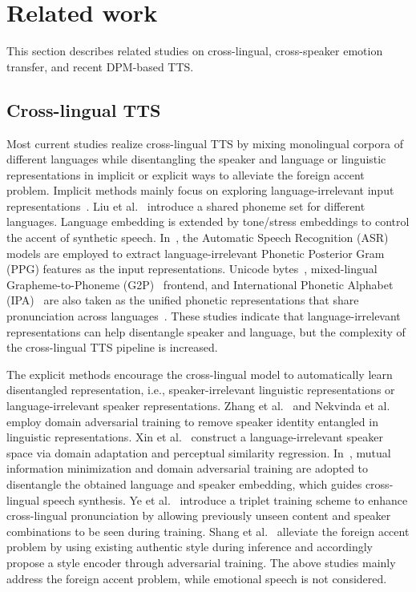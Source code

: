 \documentclass[journal,comsoc]{IEEEtran}
\begin{document}
\section{Related work}
\label{sc:related work}
This section describes related studies on cross-lingual, cross-speaker emotion transfer, and recent DPM-based TTS. 

\vspace{-0.2cm}
\subsection{Cross-lingual TTS}

Most current studies realize cross-lingual TTS by mixing monolingual corpora of different languages while disentangling the speaker and language or linguistic representations in implicit or explicit ways to alleviate the foreign accent problem.
Implicit methods mainly focus on exploring language-irrelevant input representations~\cite{9053094,zhao2020towards,bansal2020improving,maniati2021cross}.
Liu et al.~\cite{liu2020multi} introduce a shared phoneme set for different languages. Language embedding is extended by tone/stress embeddings to control the accent of synthetic speech.
In~\cite{9053094,zhao2020towards}, the Automatic Speech Recognition (ASR) models are employed to extract language-irrelevant Phonetic Posterior Gram (PPG) features as the input representations. 
Unicode bytes~\cite{li2019bytes}, mixed-lingual Grapheme-to-Phoneme (G2P)~\cite{bansal2020improving} frontend, and International Phonetic Alphabet (IPA)~\cite{chen2019cross,maniati2021cross,zhan2021improve} are also taken as the unified phonetic representations that share pronunciation across languages~\cite{ye2022improving}.
These studies indicate that language-irrelevant representations can help disentangle speaker and language, but the complexity of the cross-lingual TTS pipeline is increased.

The explicit methods encourage the cross-lingual model to automatically learn disentangled representation, i.e., speaker-irrelevant linguistic representations or language-irrelevant speaker representations.
Zhang et al.~\cite{zhang2019learning} and Nekvinda et al.~\cite{nekvinda2020one} employ domain adversarial training to remove speaker identity entangled in linguistic representations.
Xin et al.~\cite{xin2020cross} construct a language-irrelevant speaker space via domain adaptation and perceptual similarity regression. 
In~\cite{9414226}, mutual information minimization and domain adversarial training are adopted to disentangle the obtained language and speaker embedding, which guides cross-lingual speech synthesis.
Ye et al.~\cite{ye2022improving} introduce a triplet training scheme to enhance cross-lingual pronunciation by allowing previously unseen content and speaker combinations to be seen during training.    
Shang et al.~\cite{shang2021incorporating} alleviate the foreign accent problem by using existing authentic style during inference and accordingly propose a style encoder through adversarial training.
The above studies mainly address the foreign accent problem, while emotional speech is not considered.
\end{document}
